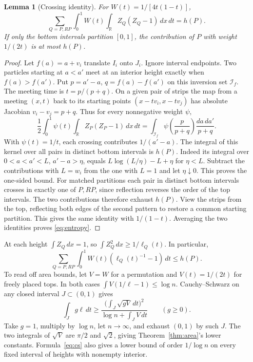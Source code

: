 \documentclass[11pt,reqno]{amsart}
\newtheorem{lemma}{Lemma}
\newcommand{\R}{\mathbb R}
\begin{document}
\begin{lemma}[Crossing identity]\label{lem:entropy}
For $W(t)=1/[4t(1-t)]$,
\begin{equation}\label{eq:entropy}
 \sum_{Q=P,RP}\int_0^1 W(t)\int_{\R}Z_Q(Z_Q-1)\,dx\,dt=h(P).
\end{equation}
If only the bottom intervals partition $[0,1]$, the contribution of $P$ with weight $1/(2t)$ is at most $h(P)$.
\end{lemma}
\begin{proof}
Let $f(a)=a+v_i$ translate $I_i$ onto $J_i$. Ignore interval endpoints. Two particles starting at $a<a'$ meet at an interior height exactly when $f(a)>f(a')$. Put $p=a'-a$, $q=f(a)-f(a')$ on this inversion set $\mathcal I_f$. The meeting time is $t=p/(p+q)$. On a given pair of strips the map from a meeting $(x,t)$ back to its starting points $(x-tv_i,x-tv_j)$ has absolute Jacobian $v_i-v_j=p+q$. Thus for every nonnegative weight $\psi$,
\[
 \frac12\int_0^1\!\psi(t)\int_{\R} Z_P(Z_P-1)\,dx\,dt
 =\int_{\mathcal I_f}\psi\!\left(\frac p{p+q}\right)
                 \frac{da\,da'}{p+q}.
\]
With $\psi(t)=1/t$, each crossing contributes $1/(a'-a)$. The integral of this kernel over all pairs in distinct bottom intervals is $h(P)$. Indeed its integral over $0<a<a'<L$, $a'-a>\eta$, equals $L\log(L/\eta)-L+\eta$ for $\eta<L$. Subtract the contributions with $L=w_i$ from the one with $L=1$ and let $\eta\downarrow0$. This proves the one-sided bound. For matched partitions each pair in distinct bottom intervals crosses in exactly one of $P,RP$, since reflection reverses the order of the top intervals. The two contributions therefore exhaust $h(P)$. View the strips from the top, reflecting both edges of the second pattern to restore a common starting partition. This gives the same identity with $1/(1-t)$. Averaging the two identities proves \eqref{eq:entropy}.
\end{proof}

At each height $\int Z_Q\,dx=1$, so $\int Z_Q^2\,dx\ge1/\ell_Q(t)$. In particular,
\begin{equation}\label{eq:budget}
 \sum_{Q=P,RP}\int_0^1 W(t)(\ell_Q(t)^{-1}-1)\,dt\le h(P).
\end{equation}
To read off area bounds, let $V=W$ for a permutation and $V(t)=1/(2t)$ for freely placed tops. In both cases $\int V(1/\ell-1)\le\log n$. Cauchy--Schwarz on any closed interval $J\subset(0,1)$ gives
\begin{equation}\label{eq:cs}
 \int_J g\ell\,dt\ge
 \frac{\bigl(\int_J\sqrt{gV}\,dt\bigr)^2}{\log n+\int_J V\,dt}
 \qquad(g\ge0).
\end{equation}
Take $g=1$, multiply by $\log n$, let $n\to\infty$, and exhaust $(0,1)$ by such $J$. The two integrals of $\sqrt V$ are $\pi/2$ and $\sqrt2$, giving Theorem~\ref{thm:area}'s lower constants. Formula~\eqref{eq:cs} also gives a lower bound of order $1/\log n$ on every fixed interval of heights with nonempty interior.
\end{document}
